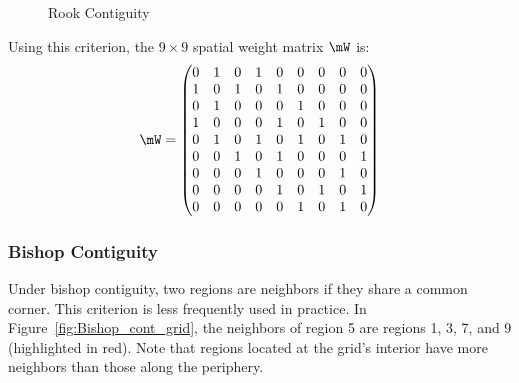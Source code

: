 \documentclass[english,12pt]{book}\usepackage[]{graphicx}\usepackage[]{xcolor}
\begin{document}
\begin{figure}[h]
\caption{Rook Contiguity}
\label{fig:Rook_cont_grid}
\centering
{}
\end{figure}

Using this criterion, the $9 \times 9$ spatial weight matrix $\mW$ is:
\begin{equation*}
  \mW = 
  \begin{pmatrix}
     0 & 1 & 0 & 1 & 0 & 0 & 0 & 0 & 0 \\
     1 & 0 & 1 & 0 & 1 & 0 & 0 & 0 & 0 \\
     0 & 1 & 0 & 0 & 0 & 1 & 0 & 0 & 0 \\
     1 & 0 & 0 & 0 & 1 & 0 & 1 & 0 & 0 \\
     0 & 1 & 0 & 1 & 0 & 1 & 0 & 1 & 0 \\
     0 & 0 & 1 & 0 & 1 & 0 & 0 & 0 & 1 \\
     0 & 0 & 0 & 1 & 0 & 0 & 0 & 1 & 0 \\
     0 & 0 & 0 & 0 & 1 & 0 & 1 & 0 & 1 \\
     0 & 0 & 0 & 0 & 0 & 1 & 0 & 1 & 0 \\
  \end{pmatrix}
\end{equation*}

\subsubsection{Bishop Contiguity}

Under bishop contiguity, two regions are neighbors if they share a common corner. This criterion is less frequently used in practice. In Figure~\ref{fig:Bishop_cont_grid}, the neighbors of region 5 are regions 1, 3, 7, and 9 (highlighted in red). Note that regions located at the grid's interior have more neighbors than those along the periphery.
\end{document}
